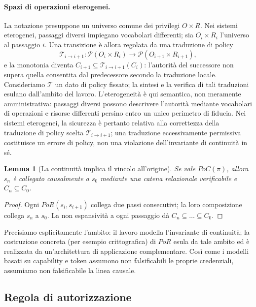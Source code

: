 \documentclass[11pt]{article}
\newtheorem{lemma}{Lemma}
\begin{document}
\paragraph{Spazi di operazioni eterogenei.}
La notazione presuppone un universo comune dei privilegi $O \times R$. Nei
sistemi eterogenei, passaggi diversi impiegano vocabolari differenti; sia
$O_i \times R_i$ l'universo al passaggio $i$. Una transizione è allora regolata
da una traduzione di policy
\[
\mathcal{T}_{i \to i+1} : \mathcal{P}(O_i \times R_i) \to
\mathcal{P}(O_{i+1} \times R_{i+1}),
\]
e la monotonia diventa
$C_{i+1} \subseteq \mathcal{T}_{i \to i+1}(C_i)$: l'autorità del successore non
supera quella consentita dal predecessore secondo la traduzione locale.
Consideriamo $\mathcal{T}$ un dato di policy fissato; la sintesi e la verifica di
tali traduzioni esulano dall'ambito del lavoro. L'eterogeneità è qui semantica,
non meramente amministrativa: passaggi diversi possono descrivere l'autorità
mediante vocabolari di operazioni e risorse differenti persino entro un unico
perimetro di fiducia. Nei sistemi eterogenei, la sicurezza è pertanto relativa
alla correttezza della traduzione di policy scelta
$\mathcal{T}_{i \to i+1}$; una traduzione eccessivamente permissiva costituisce
un errore di policy, non una violazione dell'invariante di continuità in sé.

\begin{lemma}[La continuità implica il vincolo all'origine]
Se vale $PoC(\pi)$, allora $s_n$ è collegato causalmente a $s_0$ mediante una
catena relazionale verificabile e $C_n \subseteq C_0$.
\end{lemma}

\begin{proof}
Ogni $PoR(s_i,s_{i+1})$ collega due passi consecutivi; la loro composizione
collega $s_n$ a $s_0$. La non espansività a ogni passaggio dà
$C_n \subseteq \dots \subseteq C_0$.
\end{proof}

Precisiamo esplicitamente l'ambito: il lavoro modella l'invariante di
continuità; la costruzione concreta (per esempio crittografica) di $PoR$ esula
da tale ambito ed è realizzata da un'architettura di applicazione complementare.
Così come i modelli basati su capability e token assumono non falsificabili le
proprie credenziali, assumiamo non falsificabile la linea causale.

\subsection{Regola di autorizzazione}
\end{document}
